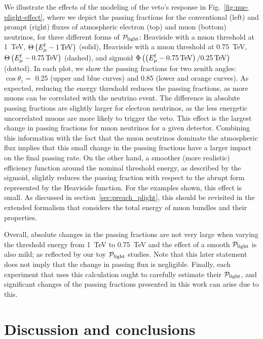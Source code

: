 \documentclass[aps,prd,showpacs,letterpaper,onecolumn,longbibliography,superscriptaddress,notitlepage,nofootinbib]{revtex4-1}%
\newcommand{\Emf}{E_{\mu}^{\rm f}}
\newcommand{\Prob}{{\cal P}}
\begin{document}
We illustrate the effects of the modeling of the veto's response in Fig.~\ref{fig:nue-plight-effect}, where we depict the passing fractions for the conventional (left) and prompt (right) fluxes of atmospheric electron (top) and muon (bottom) neutrinos, for three different forms of $\Prob_{\rm light}$: Heaviside with a muon threshold at 1~TeV, $\Theta\left(\Emf - 1 \, {\rm TeV}\right)$ (solid), Heaviside with a muon threshold at 0.75~TeV, $\Theta\left(\Emf - 0.75 \, {\rm TeV}\right)$ (dashed), and sigmoid $\Phi\left(\left(\Emf - 0.75 \, {\rm TeV}\right)/0.25 \, {\rm TeV}\right)$ (dotted). In each plot, we show the passing fractions for two zenith angles: $\cos\theta_z = $ 0.25 (upper and blue curves) and 0.85 (lower and orange curves). As expected, reducing the energy threshold reduces the passing fractions, as more muons can be correlated with the neutrino event. The difference in absolute passing fractions are slightly larger for electron neutrinos, as the less energetic uncorrelated muons are more likely to trigger the veto. This effect is the largest change in passing fractions for muon neutrinos for a given detector. Combining this information with the fact that the muon neutrinos dominate the atmospheric flux implies that this small change in the passing fractions have a larger impact on the final passing rate. On the other hand, a smoother (more realistic) efficiency function around the nominal threshold energy, as described by the sigmoid, slightly reduces the passing fraction with respect to the abrupt form represented by the Heaviside function. For the examples shown, this effect is small. As discussed in section~\ref{sec:preach_plight}, this should be revisited in the extended formalism that considers the total energy of muon bundles and their properties.

Overall, absolute changes in the passing fractions are not very large when varying the threshold energy from 1~TeV to 0.75~TeV and the effect of a smooth $\Prob_{\rm light}$ is also mild; as reflected by our toy $\Prob_{\rm light}$ studies. Note that this later statement does not imply that the change in passing flux is negligible. Finally, each experiment that uses this calculation ought to carefully estimate their $\Prob_{\rm light}$, and significant changes of the passing fractions presented in this work can arise due to this.

\newpage

\section{Discussion and conclusions}
\label{sec:conclusions}
\end{document}
